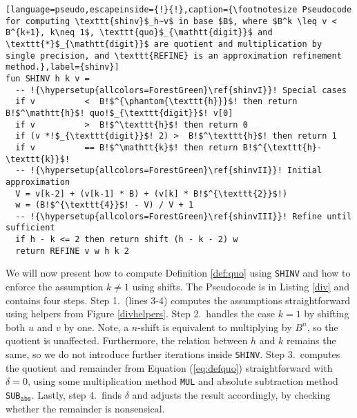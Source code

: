 \begin{lstlisting}[language=pseudo,escapeinside={!}{!},caption={\footnotesize Pseudocode for computing \texttt{shinv}$_h~v$ in base $B$, where $B^k \leq v < B^{k+1}, k\neq 1$, \texttt{quo}$_{\mathtt{digit}}$ and \texttt{*}$_{\mathtt{digit}}$ are quotient and multiplication by single precision, and \texttt{REFINE} is an approximation refinement method.},label={shinv}]
fun SHINV h k v =
  -- !{\hypersetup{allcolors=ForestGreen}\ref{shinvI}}! Special cases
  if v          <  B!$^{\phantom{\texttt{h}}}$! then return B!$^\mathtt{h}$! quo!$_{\texttt{digit}}$! v[0]
  if v          >  B!$^\texttt{h}$! then return 0
  if (v *!$_{\texttt{digit}}$! 2) >  B!$^\texttt{h}$! then return 1
  if v          == B!$^\mathtt{k}$! then return B!$^{\texttt{h}-\texttt{k}}$!
  -- !{\hypersetup{allcolors=ForestGreen}\ref{shinvII}}! Initial approximation
  V = v[k-2] + (v[k-1] * B) + (v[k] * B!$^{\texttt{2}}$!)
  w = (B!$^{\texttt{4}}$! - V) / V + 1
  -- !{\hypersetup{allcolors=ForestGreen}\ref{shinvIII}}! Refine until sufficient
  if h - k <= 2 then return shift (h - k - 2) w 
  return REFINE v w h k 2
\end{lstlisting}

We will now present how to compute Definition \ref{def:quo} using \texttt{SHINV}
and how to enforce the assumption $k\neq 1$ using shifts. The Pseudocode is in
Listing \ref{div} and contains four steps. Step 1.\ (lines 3-4) computes the
assumptions straightforward using helpers from Figure \ref{divhelpers}. Step
2.\ handles the case $k=1$ by shifting both $u$ and $v$ by one. Note, a $n$-shift
is equivalent to multiplying by $B^n$, so the quotient is
unaffected. Furthermore, the relation between $h$ and $k$ remains the same, so
we do not introduce further iterations inside \texttt{SHINV}. Step 3.\ computes
the quotient and remainder from Equation (\ref{eq:defquo}) straightforward with
$\delta=0$, using some multiplication method \texttt{MUL} and absolute subtraction
method \texttt{SUB}$_{\mathtt{abs}}$. Lastly, step 4.\ finds $\delta$ and adjusts the
result accordingly, by checking whether the remainder is nonsensical.

